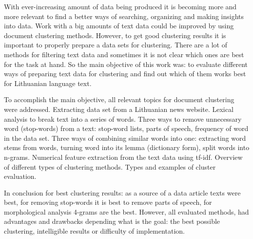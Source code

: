 \documentclass{VUMIFInfBakalaurinis}
\begin{document}

With ever-increasing amount of data being produced it is becoming more
and more relevant to find a better ways of searching, organizing and
making insights into data. Work with a big amounts of text data could be
improved by using document clustering methods. However, to get good
clustering results it is important to properly prepare a data sets for
clustering. There are a lot of methods for filtering text data and
sometimes it is not clear which ones are best for the task at hand. So the
main objective of this work was: to evaluate different ways of preparing text
data for clustering and find out which of them works best for Lithuanian language
text.

To accomplish the main objective, all relevant topics for document clustering
were addressed. Extracting data set from a Lithuanian news website.
Lexical analysis to break text into a series of words. Three ways to
remove unnecessary word (stop-words) from a text: stop-word lists, parts
of speech, frequency of word in the data set. Three ways of combining
similar words into one: extracting word stems from words, turning word
into its lemma (dictionary form), split words into n-grams. Numerical
feature extraction from the text data using tf-idf. Overview of different
types of clustering methods. Types and examples of cluster evaluation.

In conclusion for best clustering results: as a source of a data article
texts were best, for removing stop-words it is best to remove parts of
speech, for morphological analysis 4-grams are the best. However, all
evaluated methods, had advantages and drawbacks depending what is the
goal: the best possible clustering, intelligible results or difficulty
of implementation.

\printbibliography[heading=bibintoc] %

\appendix  %
\end{document}
